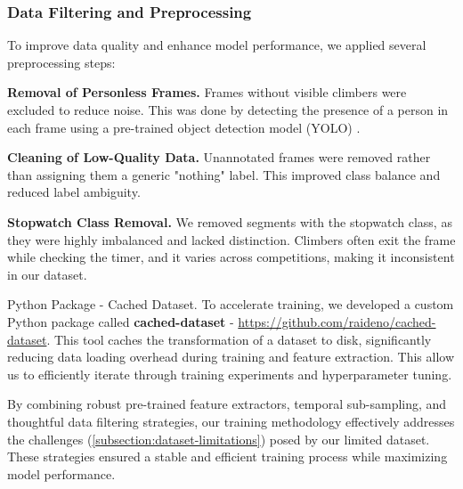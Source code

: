 \subsubsection*{Data Filtering and Preprocessing}
To improve data quality and enhance model performance, we applied several preprocessing steps:

\noindent\textbf{Removal of Personless Frames.} Frames without visible climbers were excluded to reduce noise. This was done by detecting the presence of a person in each frame using a pre-trained object detection model (YOLO) \cite{yolo}.

\noindent\textbf{Cleaning of Low-Quality Data.} Unannotated frames were removed rather than assigning them a generic "nothing" label. This improved class balance and reduced label ambiguity.

\noindent\textbf{Stopwatch Class Removal.} We removed segments with the stopwatch class, as they were highly imbalanced and lacked distinction. Climbers often exit the frame while checking the timer, and it varies across competitions, making it inconsistent in our dataset.

\begin{AIbox}{Python Package - Cached Dataset.}
    To accelerate training, we developed a custom Python package called \textbf{cached-dataset} - \href{https://github.com/raideno/cached-dataset}{https://github.com/raideno/cached-dataset}. This tool caches the transformation of a dataset to disk, significantly reducing data loading overhead during training and feature extraction. This allow us to efficiently iterate through training experiments and hyperparameter tuning.
\end{AIbox}

By combining robust pre-trained feature extractors, temporal sub-sampling, and thoughtful data filtering strategies, our training methodology effectively addresses the challenges (\ref{subsection:dataset-limitations}) posed by our limited dataset. These strategies ensured a stable and efficient training process while maximizing model performance.